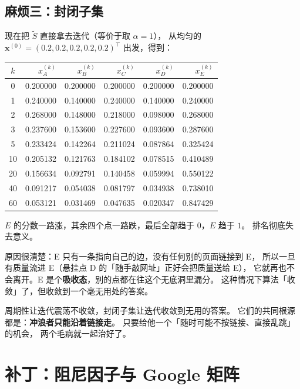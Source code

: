 \documentclass[UTF8,11pt,fontset=macnew]{ctexart}
\newcommand{\xv}{\mathbf{x}}
\begin{document}
\subsection{麻烦三：封闭子集}

现在把 $\tilde S$ 直接拿去迭代（等价于取 $\alpha=1$），
从均匀的 $\xv^{(0)}=(0.2,0.2,0.2,0.2,0.2)^\top$ 出发，得到：

\begin{center}
\footnotesize
\begin{tabular}{c rrrrr}
\toprule
$k$ & $x_A^{(k)}$ & $x_B^{(k)}$ & $x_C^{(k)}$ & $x_D^{(k)}$ & $x_E^{(k)}$\\
\midrule
0  & 0.200000 & 0.200000 & 0.200000 & 0.200000 & 0.200000\\
1  & 0.240000 & 0.140000 & 0.240000 & 0.140000 & 0.240000\\
2  & 0.268000 & 0.148000 & 0.218000 & 0.098000 & 0.268000\\
3  & 0.237600 & 0.153600 & 0.227600 & 0.093600 & 0.287600\\
5  & 0.233424 & 0.142264 & 0.211024 & 0.087864 & 0.325424\\
10 & 0.205132 & 0.121763 & 0.184102 & 0.078515 & 0.410489\\
20 & 0.156634 & 0.092791 & 0.140458 & 0.059994 & 0.550122\\
40 & 0.091217 & 0.054038 & 0.081797 & 0.034938 & 0.738010\\
60 & 0.053121 & 0.031469 & 0.047635 & 0.020347 & 0.847429\\
\bottomrule
\end{tabular}
\end{center}

$E$ 的分数一路涨，其余四个点一路跌，最后全部趋于 $0$，$E$ 趋于 $1$。
排名彻底失去意义。

原因很清楚：E 只有一条指向自己的边，没有任何别的页面链接到 E，
所以一旦有质量流进 E（悬挂点 D 的「随手敲网址」正好会把质量送给 E），
它就再也不会离开。E 是个\textbf{吸收态}，别的点都在往这个无底洞里漏分。
这种情况下算法「收敛」了，但收敛到一个毫无用处的答案。

\begin{keybox}[小结：两种毛病的共同根源]
周期性让迭代震荡不收敛，封闭子集让迭代收敛到无用的答案。
它们的共同根源都是：\textbf{冲浪者只能沿着链接走}。
只要给他一个「随时可能不按链接、直接乱跳」的机会，
两个毛病就一起治好了。
\end{keybox}

\section{补丁：阻尼因子与 Google 矩阵}
\end{document}
